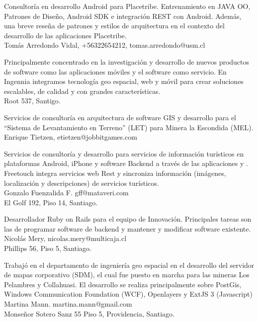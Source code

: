 \documentclass[11pt,letterpaper,roman]{moderncv}
\begin{document}
 {\tchr} {\placetribe} {\stgo} {}
{Consultoría en desarrollo Android para Placetribe. Entrenamiento en JAVA OO,
Patrones de Diseño, Android SDK e integración REST con Android. Además, una
breve reseña de patrones y estilos de arquitectura en el contexto del desarrollo
de las aplicaciones Placetribe. \\ Tomás Arredondo Vidal, +56322654212, tomas.arredondo@usm.cl}


 {\cf} {\ingennia} {\stgo} {}
{Principalmente concentrado en la investigación y desarrollo de nuevos productos
de software como las aplicaciones móviles y el software como servicio. En
Ingennia integramos tecnología geo espacial, web y móvil para crear soluciones
escalables, de calidad y con grandes características. \\ Root 537, Santigo.}

 {\scd} {\jobbitgames} {\stgo} {}
{Servicios de consultoría en arquitectura de software GIS y desarrollo para el
``Sistema de Levantamiento en Terreno'' (LET) para Minera la Escondida (MEL).
\\ Enrique Tietzen, etietzen@jobbitgames.com}


 {\scd} {\mataveri} {\stgo} {}
{Servicios de consultoría y desarrollo para servicios de información turísticos en
plataformas Android, iPhone y software Backend a través de las aplicaciones
\freetouchchile y \freetouchperu. Freetouch integra servicios web Rest y
sincroniza información (imágenes, localización y descripciones) de servicios
turísticos. \\ 
Gonzalo Fuenzalida F. gff@mataveri.com \\ El Golf 192, Piso 14, Santiago.}

 {\se} {\multicaja} {\stgo} {}
{Desarrollador Ruby on Rails para el equipo de Innovación. Principales tareas
son las de programar software de backend y mantener y modificar software
existente. \\ Nicolás Mery, nicolas.mery@multicaja.cl \\ Phillips 56, Piso 5, Santiago.}


 {\sd} {\ikom} {\stgo} {}
{Trabajó en el departamento de ingeniería geo espacial en el desarrollo del
servidor de mapas corporativo (SDM), el cual fue puesto en marcha para las
mineras Los Pelambres y Collahuasi. El desarrollo se realiza principalmente
sobre PostGis, Windows Communication Foundation (WCF), Openlayers y ExtJS 3
(Javascript) \\ Martina Mann. martina.mann@gmail.com \\ Monseñor Sotero Sanz 55 Piso 5, Providencia, Santiago.} 
\end{document}
